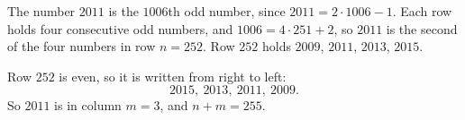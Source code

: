 The number $2011$ is the $1006$th odd number, since $2011=2\cdot1006-1$. Each row holds four consecutive odd numbers, and $1006=4\cdot251+2$, so $2011$ is the second of the four numbers in row $n=252$. Row $252$ holds $2009$, $2011$, $2013$, $2015$.

Row $252$ is even, so it is written from right to left:
\[
2015,\ 2013,\ 2011,\ 2009 .
\]
So $2011$ is in column $m=3$, and $n+m=\boxed{255}$.
